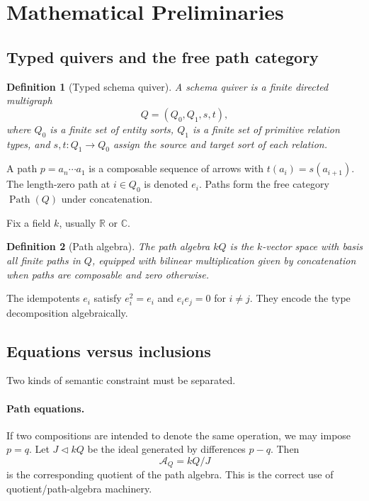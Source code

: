 \documentclass[11pt]{article}
\newtheorem{definition}{Definition}[section]
\newcommand{\Path}{\operatorname{Path}}
\newcommand{\A}{\mathcal{A}}
\begin{document}
\section{Mathematical Preliminaries}

\subsection{Typed quivers and the free path category}

\begin{definition}[Typed schema quiver]
A \emph{schema quiver} is a finite directed multigraph
\[
Q=(Q_0,Q_1,s,t),
\]
where $Q_0$ is a finite set of entity sorts, $Q_1$ is a finite set of primitive relation types, and $s,t:Q_1\to Q_0$ assign the source and target sort of each relation.
\end{definition}

A path $p=a_n\cdots a_1$ is a composable sequence of arrows with $t(a_i)=s(a_{i+1})$. The length-zero path at $i\in Q_0$ is denoted $e_i$. Paths form the free category $\Path(Q)$ under concatenation.

Fix a field $k$, usually $\mathbb{R}$ or $\mathbb{C}$.

\begin{definition}[Path algebra]
The \emph{path algebra} $kQ$ is the $k$-vector space with basis all finite paths in $Q$, equipped with bilinear multiplication given by concatenation when paths are composable and zero otherwise.
\end{definition}

The idempotents $e_i$ satisfy $e_i^2=e_i$ and $e_ie_j=0$ for $i\neq j$. They encode the type decomposition algebraically.

\subsection{Equations versus inclusions}
Two kinds of semantic constraint must be separated.

\paragraph{Path equations.} If two compositions are intended to denote the same operation, we may impose $p=q$. Let $J\triangleleft kQ$ be the ideal generated by differences $p-q$. Then
\[
\A_Q=kQ/J
\]
is the corresponding quotient of the path algebra. This is the correct use of quotient/path-algebra machinery.
\end{document}
